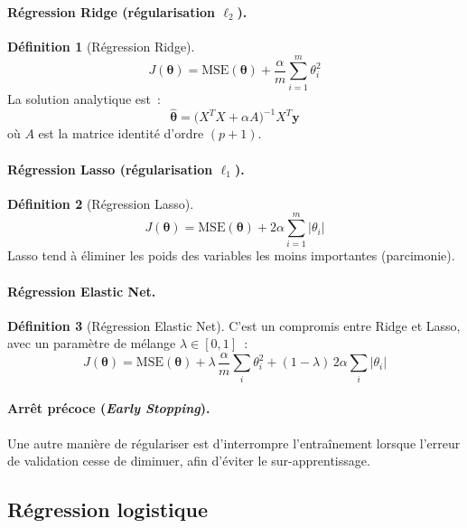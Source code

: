 \documentclass[a4paper,12pt,twoside]{report}
\theoremstyle{definition}
\newtheorem{defi}{Définition}
\theoremstyle{plain}
\theoremstyle{remark}
\newcommand{\rv}[1]{\boldsymbol{#1}}
\begin{document}
\paragraph{Régression Ridge (régularisation $\ell_2$).}

\begin{defi}[Régression Ridge]
\[
J(\rv{\theta}) = \text{MSE}(\rv{\theta}) + \frac{\alpha}{m}\sum_{i=1}^{m}\theta_i^2
\]
La solution analytique est~:
\[
\hat{\rv{\theta}} = \bigl(X^T X + \alpha A\bigr)^{-1} X^T \rv{y}
\]
où $A$ est la matrice identité d'ordre $(p+1)$.
\end{defi}

\paragraph{Régression Lasso (régularisation $\ell_1$).}

\begin{defi}[Régression Lasso]
\[
J(\rv{\theta}) = \text{MSE}(\rv{\theta}) + 2\alpha\sum_{i=1}^{m}|\theta_i|
\]
Lasso tend à éliminer les poids des variables les moins importantes (parcimonie).
\end{defi}

\paragraph{Régression Elastic Net.}

\begin{defi}[Régression Elastic Net]
C'est un compromis entre Ridge et Lasso, avec un paramètre de mélange $\lambda \in [0,1]$~:
\[
J(\rv{\theta}) = \text{MSE}(\rv{\theta})
  + \lambda\,\frac{\alpha}{m}\sum_{i}\theta_i^2
  + (1-\lambda)\,2\alpha\sum_{i}|\theta_i|
\]
\end{defi}

\paragraph{Arrêt précoce (\textit{Early Stopping}).}

Une autre manière de régulariser est d'interrompre l'entraînement lorsque l'erreur de
validation cesse de diminuer, afin d'éviter le sur-apprentissage.

\subsection{Régression logistique}
\label{subsec:logistique}
\end{document}
